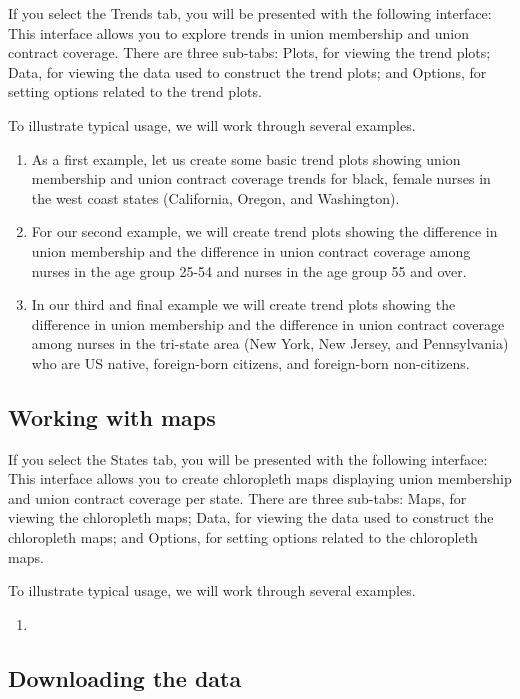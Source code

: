 \documentclass[letterpaper,12pt]{article}
\begin{document}
If you select the Trends tab, you will be presented with the following
interface:
This interface allows you to explore trends in union membership and
union contract coverage. There are three sub-tabs: Plots, for viewing
the trend plots; Data, for viewing the data used to construct the
trend plots; and Options, for setting options related to the trend
plots.

To illustrate typical usage, we will work through several examples.
\begin{enumerate}
\item As a first example, let us create some basic trend plots showing
  union membership and union contract coverage trends for black,
  female nurses in the west coast states (California, Oregon, and
  Washington).


\item For our second example, we will create trend plots showing the
  difference in union membership and the difference in union contract
  coverage among nurses in the age group 25-54 and nurses in the age
  group 55 and over.


\item In our third and final example we will create trend plots
  showing the difference in union membership and the difference in
  union contract coverage among nurses in the tri-state area (New
  York, New Jersey, and Pennsylvania) who are US native, foreign-born
  citizens, and foreign-born non-citizens.


\end{enumerate}

\subsection{Working with maps}

If you select the States tab, you will be presented with the following
interface:
This interface allows you to create chloropleth maps displaying union
membership and union contract coverage per state. There are three
sub-tabs: Maps, for viewing the chloropleth maps; Data, for viewing
the data used to construct the chloropleth maps; and Options, for
setting options related to the chloropleth maps.

To illustrate typical usage, we will work through several examples.
\begin{enumerate}
\item

\end{enumerate}

\subsection{Downloading the data}
\end{document}
